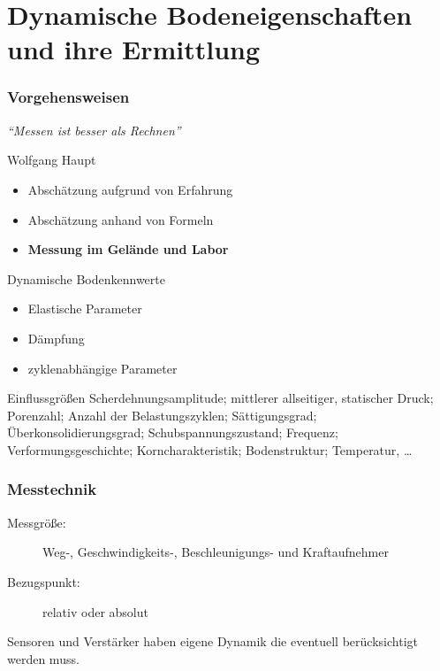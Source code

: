 \documentclass[hyperref={pdfpagemode=FullScreen, colorlinks=false}]{beamer}
\begin{document}
\maketitle


\section{Dynamische Bodeneigenschaften und ihre Ermittlung}

\begin{frame}
\frametitle{Vorgehensweisen}
\begin{center}
\Large
 \textsl{``Messen ist besser als Rechnen''}
\end{center}
\hfill Wolfgang Haupt \cite{haupt1986bodendynamik}

\vfill

\begin{itemize}
 \item Abschätzung aufgrund von Erfahrung
 \item Abschätzung anhand von Formeln
 \item \textbf{Messung im Gelände und Labor}
\end{itemize}
\end{frame}


\begin{frame}
\begin{TUBAFinblock}{Dynamische Bodenkennwerte}
\begin{itemize}
        \item Elastische Parameter
        \item Dämpfung
        \item zyklenabhängige Parameter
\end{itemize}
\end{TUBAFinblock}

\begin{TUBAFinblock}{Einflussgrößen}
Scherdehnungsamplitude; mittlerer allseitiger, statischer Druck; Porenzahl; Anzahl der Belastungszyklen; Sättigungsgrad; Überkonsolidierungsgrad; Schubspannungszustand; Frequenz; Verformungsgeschichte; Korncharakteristik; Bodenstruktur; Temperatur,  \dots 
\end{TUBAFinblock}

\end{frame}


\begin{frame}
\frametitle{Messtechnik}

\begin{description}
 \item[Messgröße:] Weg-, Geschwindigkeits-, Beschleunigungs- und Kraftaufnehmer
 \item[Bezugspunkt:] relativ oder absolut
 \item[]
\end{description}
Sensoren und Verstärker haben eigene Dynamik die eventuell berücksichtigt werden muss.
\end{frame}
\end{document}
